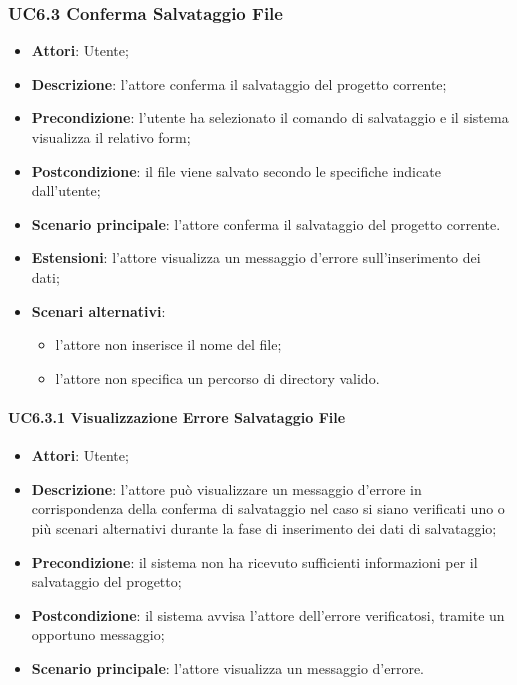 \subsubsection{UC6.3 Conferma Salvataggio File}
\label{UC6.3}
\begin{itemize}
	\item \textbf{Attori}: Utente;
	\item \textbf{Descrizione}: l'attore conferma il salvataggio del progetto corrente;
	\item \textbf{Precondizione}: l'utente ha selezionato il comando di salvataggio e il sistema visualizza il relativo form;
	\item \textbf{Postcondizione}: il file viene salvato secondo le specifiche indicate dall'utente;
	\item \textbf{Scenario principale}: l'attore conferma il salvataggio del progetto corrente.
	\item \textbf{Estensioni}: l'attore visualizza un messaggio d'errore sull'inserimento dei dati;
	\item \textbf{Scenari alternativi}:
		\begin{itemize}
		\item l'attore non inserisce il nome del file;
		\item l'attore non specifica un percorso di directory valido.
	\end{itemize}
\end{itemize}

\paragraph{UC6.3.1 Visualizzazione Errore Salvataggio File}
\begin{itemize}
	\item \textbf{Attori}: Utente;
	\item \textbf{Descrizione}: l'attore può visualizzare un messaggio d'errore in corrispondenza della conferma di salvataggio nel caso si siano verificati uno o più scenari alternativi durante la fase di inserimento dei dati di salvataggio;
	\item \textbf{Precondizione}: il sistema non ha ricevuto sufficienti informazioni per il salvataggio del progetto;
	\item \textbf{Postcondizione}: il sistema avvisa l'attore dell'errore verificatosi, tramite un opportuno messaggio;
	\item \textbf{Scenario principale}: l'attore visualizza un messaggio d'errore.
\end{itemize}


